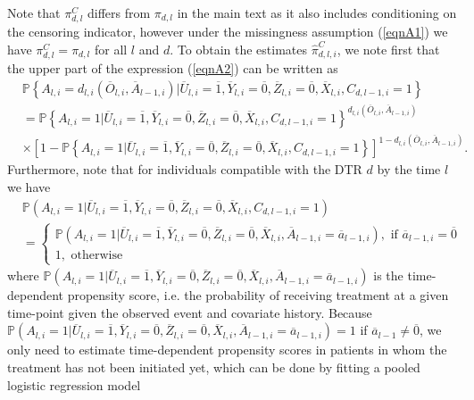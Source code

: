 \documentclass[12pt]{article}
\begin{document}
Note that $\pi^C_{d,l}$ differs from $\pi_{d,l}$ in the main text as it also includes conditioning on the censoring indicator, however under the missingness assumption (\ref{eqnA1}) we have $\pi^C_{d,l} = \pi_{d,l}$ for all $l$ and $d$. To obtain the estimates $\hat{\pi}^C_{d,l,i}$, we note first that the upper part of the expression (\ref{eqnA2}) can be written as
\begin{align*}
&\mathbb{P} \left\lbrace A_{l,i} = d_{l,i} \left( \overline{O}_{l,i}, \overline{A}_{l-1,i} \right) \vert \overline{U}_{l,i} = \overline{1}, \overline{Y}_{l,i} = \overline{0}, \overline{Z}_{l,i} = \overline{0}, \overline{X}_{l,i},  C_{d,l-1,i} = 1 \right\rbrace \\
&=\mathbb{P} \left\lbrace A_{l,i} = 1 \vert \overline{U}_{l,i} = \overline{1},  \overline{Y}_{l,i} = \overline{0}, \overline{Z}_{l,i} = \overline{0}, \overline{X}_{l,i},  C_{d,l-1,i} = 1 \right\rbrace^{d_{l,i} \left( \overline{O}_{l,i}, \overline{A}_{l-1,i} \right)} \\
&\times \left[ 1-\mathbb{P} \left\lbrace A_{l,i} = 1 \vert \overline{U}_{l,i} = \overline{1},  \overline{Y}_{l,i} = \overline{0}, \overline{Z}_{l,i} = \overline{0}, \overline{X}_{l,i},  C_{d,l-1,i} = 1 \right\rbrace \right]^{1-d_{l,i} \left( \overline{O}_{l,i}, \overline{A}_{l-1,i} \right)}.
\end{align*}
Furthermore, note that for individuals compatible with the DTR $d$ by the time $l$ we have
\begin{align*}
& \mathbb{P} \left( A_{l,i} = 1 \vert \overline{U}_{l,i} = \overline{1},  \overline{Y}_{l,i} = \overline{0}, \overline{Z}_{l,i} = \overline{0}, \overline{X}_{l,i},  C_{d,l-1,i} = 1 \right) \\
&=
\begin{cases}
\mathbb{P} \left( A_{l,i} = 1 \vert \overline{U}_{l,i} = \overline{1},  \overline{Y}_{l,i} = \overline{0}, \overline{Z}_{l,i} = \overline{0},  \overline{X}_{l,i},  \overline{A}_{l-1,i} = \overline{a}_{l-1,i} \right),\text{ if } \overline{a}_{l-1,i} = \overline{0} \\
1,\text{ otherwise}
\end{cases}
\end{align*}
where $\mathbb{P} \left( A_{l,i} = 1 \vert \overline{U}_{l,i} = \overline{1},  \overline{Y}_{l,i} = \overline{0}, \overline{Z}_{l,i} = \overline{0}, \overline{X}_{l,i},\overline{A}_{l-1,i} = \overline{a}_{l-1,i} \right)$ is the time-dependent propensity score, i.e. the probability of receiving treatment at a given time-point given the observed event and covariate history. Because $\mathbb{P} \left( A_{l,i} = 1 \vert \overline{U}_{l,i} = \overline{1},  \overline{Y}_{l,i} = \overline{0}, \overline{Z}_{l,i} = \overline{0},  \overline{X}_{l,i},  \overline{A}_{l-1,i} = \overline{a}_{l-1,i} \right) = 1$ if $\overline{a}_{l-1} \neq \overline{0}$,  we only need to estimate time-dependent propensity scores in patients in whom the treatment has not been initiated yet, which can be done by fitting a pooled logistic regression model
\end{document}
